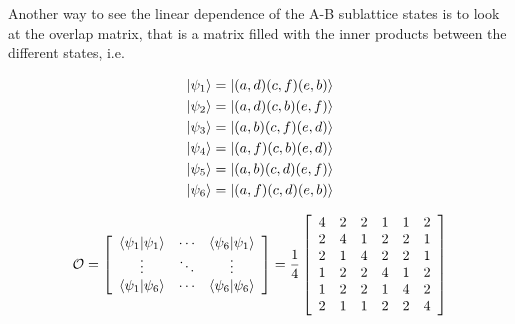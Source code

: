 Another way to see the linear dependence of the A-B sublattice states is to look at the overlap matrix, that is a matrix filled with the inner products between the different states, i.e.

\begin{minipage}{0.0\textwidth} 
\centering
	\begin{align*}
		\lvert {\psi_1} \rangle &= \lvert {(a,d)(c,f)(e,b)} \rangle \\
		\lvert {\psi_2} \rangle &= \lvert {(a,d)(c,b)(e,f)} \rangle \\
		\lvert {\psi_3} \rangle &= \lvert {(a,b)(c,f)(e,d)} \rangle \\
		\lvert {\psi_4} \rangle &= \lvert {(a,f)(c,b)(e,d)} \rangle \\
		\lvert {\psi_5} \rangle &= \lvert {(a,b)(c,d)(e,f)} \rangle \\
		\lvert {\psi_6} \rangle &= \lvert {(a,f)(c,d)(e,b)} \rangle 
	\end{align*}
\end{minipage}
\hspace{0.5cm}
\begin{minipage}[b]{0.0\linewidth}
\centering 
	\begin{equation}
		\mathcal{O} = \left[\begin{array}{ccc}
		\langle{\psi_1}\vert{\psi_1}\rangle & \cdots & \langle{\psi_6}\vert{\psi_1}\rangle\\
		\vdots&\ddots&\vdots\\
		\langle{\psi_1}\vert{\psi_6}\rangle&\cdots&\langle{\psi_6}\vert{\psi_6}\rangle\\
		\end{array}\right] =
		\frac{1}{4}
		\left[\begin{array}{cccccc}
		4&2&2&1&1&2\\
		2&4&1&2&2&1\\
		2&1&4&2&2&1\\
		1&2&2&4&1&2\\
		1&2&2&1&4&2\\
		2&1&1&2&2&4
		\end{array}\right] \nonumber
	\end{equation}
\end{minipage}


